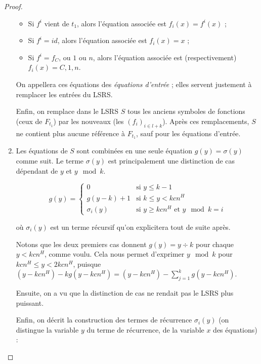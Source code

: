 \documentclass{article}
\begin{document}
\begin{proof}
\begin{enumerate}[itemsep=-1mm,leftmargin=2cm]
						\begin{itemize}[itemsep=-1mm,leftmargin=1cm]
							\item	Si $f^i$ vient de $t_1$, alors l'équation associée est $f_i(x) = f^i(x)$ ;
							\item 	Si $f^i = id$, alors l'équation associée est $f_i(x) = x$ ;
							\item 	Si $f^i = f_C$, ou $1$ ou $n$, alors l'équation associée est (respectivement) $f_i(x) = C, 1, n$. 
						\end{itemize}
				
					
					On appellera ces équations des \emph{équations d'entrée} ; elles servent justement à remplacer les entrées du LSRS.
					
					Enfin, on remplace dans le LSRS $S$ tous les anciens symboles de fonctions (ceux de $F_{t_1}$) par les nouveaux (les $(f_i)_{i \in l+k}$). Après ces remplacements, $S$ ne contient plus aucune référence à $F_{t_1}$, sauf pour les équations d'entrée. 
					
				\item 	
					Les équations de $S$ sont combinées en une seule équation $g(y) = \sigma(y)$ comme suit. Le terme $\sigma(y)$ est principalement une distinction de cas dépendant de $y$ et $y \mod{k}$. 
				
					\[
						g(y) = 
							\left\lbrace \begin{array}{ll}
								0 				& \text{si $y \leqslant k-1$} \\
								g(y-k) + 1 		& \text{si $k \leqslant y < kcn^H$} \\
								\sigma_i(y)		& \text{si $y \geqslant kcn^H$ et $y \mod{k} = i$}
							\end{array}\right.
					\]
					
					où $\sigma_i(y)$ est un terme récursif qu'on explicitera tout de suite après. 
					
					Notons que les deux premiers cas donnent $g(y) = y \div k$ pour chaque $y < kcn^H$, comme voulu. Cela nous permet d'exprimer $y \mod{k}$ pour $kcn^H \leqslant y < 2kcn^H$, puisque $(y-kcn^H) - kg(y-kcn^H) = (y-kcn^H) - \sum_{j=1}^{k} g(y-kcn^H)$. 
					
					Ensuite, on a vu que la distinction de cas ne rendait pas le LSRS plus puissant. 
					
					Enfin, on décrit la construction des termes de récurrence $\sigma_i(y)$ (on distingue la variable $y$ du terme de récurrence, de la variable $x$ des équations) :
					

\end{enumerate}
\end{proof}
\end{document}

